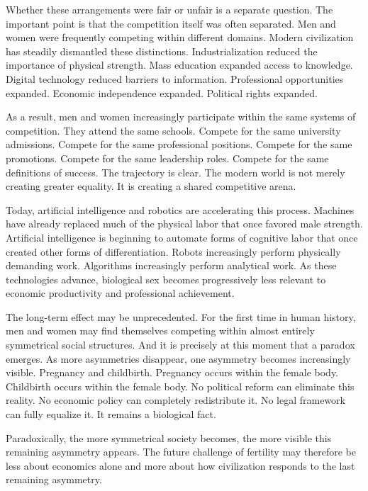 \documentclass[12pt]{article}
\begin{document}
Whether these arrangements were fair or unfair is a separate question. The important point is that the competition itself was often separated. Men and women were frequently competing within different domains. Modern civilization has steadily dismantled these distinctions. Industrialization reduced the importance of physical strength. Mass education expanded access to knowledge. Digital technology reduced barriers to information. Professional opportunities expanded. Economic independence expanded. Political rights expanded.

As a result, men and women increasingly participate within the same systems of competition. They attend the same schools. Compete for the same university admissions. Compete for the same professional positions. Compete for the same promotions. Compete for the same leadership roles. Compete for the same definitions of success. The trajectory is clear. The modern world is not merely creating greater equality. It is creating a shared competitive arena. 

Today, artificial intelligence and robotics are accelerating this process. Machines have already replaced much of the physical labor that once favored male strength. Artificial intelligence is beginning to automate forms of cognitive labor that once created other forms of differentiation. Robots increasingly perform physically demanding work. Algorithms increasingly perform analytical work. As these technologies advance, biological sex becomes progressively less relevant to economic productivity and professional achievement.

The long-term effect may be unprecedented. For the first time in human history, men and women may find themselves competing within almost entirely symmetrical social structures. And it is precisely at this moment that a paradox emerges. As more asymmetries disappear, one asymmetry becomes increasingly visible. Pregnancy and childbirth. Pregnancy occurs within the female body. Childbirth occurs within the female body. No political reform can eliminate this reality. No economic policy can completely redistribute it. No legal framework can fully equalize it. It remains a biological fact.

Paradoxically, the more symmetrical society becomes, the more visible this remaining asymmetry appears. The future challenge of fertility may therefore be less about economics alone and more about how civilization responds to the last remaining asymmetry.
\end{document}
